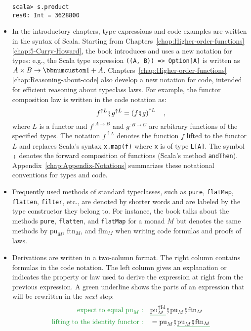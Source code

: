 \begin{itemize}
\begin{lstlisting}[mathescape=true]
scala> s.product
res0: Int = 3628800 
\end{lstlisting}
\item In the introductory chapters, type expressions and code examples are
written in the syntax of Scala. Starting from Chapters~\ref{chap:Higher-order-functions}\textendash \ref{chap:5-Curry-Howard},
the book introduces and uses a new notation for types: e.g., the Scala
type expression \lstinline!((A, B)) => Option[A]! is written as $A\times B\rightarrow\bbnum 1+A$.
Chapters~\ref{chap:Higher-order-functions}\textendash \ref{chap:Reasoning-about-code}
also develop a new notation for code, intended for efficient reasoning
about typeclass laws. For example, the functor composition law is
written in the code notation as:
\[
f^{\uparrow L}\bef g^{\uparrow L}=\left(f\bef g\right)^{\uparrow L}\quad,
\]
where $L$ is a functor and $f^{:A\rightarrow B}$ and $g^{:B\rightarrow C}$
are arbitrary functions of the specified types. The notation $f^{\uparrow L}$
denotes the function $f$ lifted to the functor $L$ and replaces
Scala\textsf{'}s syntax \lstinline!x.map(f)! where \lstinline!x! is of type
\lstinline!L[A]!. The symbol $\bef$ denotes the forward composition
of functions (Scala\textsf{'}s method \lstinline!andThen!). Appendix~\ref{chap:Appendix-Notations}
summarizes these notational conventions for types and code.
\item Frequently used methods of standard typeclasses, such as \lstinline!pure!,
\lstinline!flatMap!, \lstinline!flatten!, \lstinline!filter!, etc.,
are denoted by shorter words and are labeled by the type constructor
they belong to. For instance, the book talks about the methods \lstinline!pure!,
\lstinline!flatten!, and \lstinline!flatMap! for a monad $M$ but
denotes the same methods by $\text{pu}_{M}$, $\text{ftn}_{M}$, and
$\text{flm}_{M}$ when writing code formulas and proofs of laws.
\item Derivations are written in a two-column format. The right column contains
formulas in the code notation. The left column gives an explanation
or indicates the property or law used to derive the expression at
right from the previous expression. A green underline shows the parts
of an expression that will be rewritten in the \emph{next} step:
\begin{align*}
{\color{greenunder}\text{expect to equal }\text{pu}_{M}:}\quad & \gunderline{\text{pu}_{M}^{\uparrow\text{Id}}}\bef\text{pu}_{M}\bef\text{ftn}_{M}\\
{\color{greenunder}\text{lifting to the identity functor}:}\quad & =\text{pu}_{M}\bef\gunderline{\text{pu}_{M}\bef\text{ftn}_{M}}\\

\end{align*}
\end{itemize}
